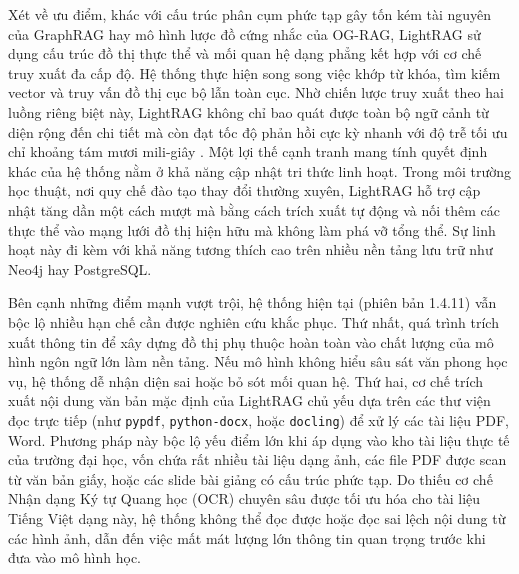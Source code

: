 Xét về ưu điểm, khác với cấu trúc phân cụm phức tạp gây tốn kém tài nguyên của GraphRAG hay mô hình lược đồ cứng nhắc của OG-RAG, LightRAG sử dụng cấu trúc đồ thị thực thể và mối quan hệ dạng phẳng kết hợp với cơ chế truy xuất đa cấp độ. Hệ thống thực hiện song song việc khớp từ khóa, tìm kiếm vector và truy vấn đồ thị cục bộ lẫn toàn cục. Nhờ chiến lược truy xuất theo hai luồng riêng biệt này, LightRAG không chỉ bao quát được toàn bộ ngữ cảnh từ diện rộng đến chi tiết mà còn đạt tốc độ phản hồi cực kỳ nhanh với độ trễ tối ưu chỉ khoảng tám mươi mili-giây \cite{guo2025lightrag}. Một lợi thế cạnh tranh mang tính quyết định khác của hệ thống nằm ở khả năng cập nhật tri thức linh hoạt. Trong môi trường học thuật, nơi quy chế đào tạo thay đổi thường xuyên, LightRAG hỗ trợ cập nhật tăng dần một cách mượt mà bằng cách trích xuất tự động và nối thêm các thực thể vào mạng lưới đồ thị hiện hữu mà không làm phá vỡ tổng thể. Sự linh hoạt này đi kèm với khả năng tương thích cao trên nhiều nền tảng lưu trữ như Neo4j hay PostgreSQL.

Bên cạnh những điểm mạnh vượt trội, hệ thống hiện tại (phiên bản 1.4.11) vẫn bộc lộ nhiều hạn chế cần được nghiên cứu khắc phục. Thứ nhất, quá trình trích xuất thông tin để xây dựng đồ thị phụ thuộc hoàn toàn vào chất lượng của mô hình ngôn ngữ lớn làm nền tảng. Nếu mô hình không hiểu sâu sát văn phong học vụ, hệ thống dễ nhận diện sai hoặc bỏ sót mối quan hệ. Thứ hai, cơ chế trích xuất nội dung văn bản mặc định của LightRAG chủ yếu dựa trên các thư viện đọc trực tiếp (như \texttt{pypdf}, \texttt{python-docx}, hoặc \texttt{docling}) để xử lý các tài liệu PDF, Word. Phương pháp này bộc lộ yếu điểm lớn khi áp dụng vào kho tài liệu thực tế của trường đại học, vốn chứa rất nhiều tài liệu dạng ảnh, các file PDF được scan từ văn bản giấy, hoặc các slide bài giảng có cấu trúc phức tạp. Do thiếu cơ chế Nhận dạng Ký tự Quang học (OCR) chuyên sâu được tối ưu hóa cho tài liệu Tiếng Việt dạng này, hệ thống không thể đọc được hoặc đọc sai lệch nội dung từ các hình ảnh, dẫn đến việc mất mát lượng lớn thông tin quan trọng trước khi đưa vào mô hình học.

